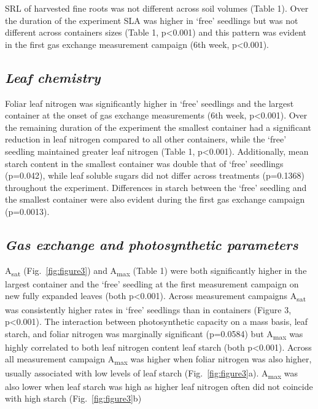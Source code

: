 \documentclass[a4paper]{article}\usepackage[]{graphicx}\usepackage[]{color}
\begin{document}
SRL of harvested fine roots was not different across soil volumes (Table 1). Over the duration of the experiment SLA was higher in ‘free’ seedlings but was not different across containers sizes (Table 1, p\textless0.001) and this pattern was evident in the first gas exchange measurement campaign (6th week, p\textless0.001).


\subsection*{\textit{Leaf chemistry}}
Foliar leaf nitrogen was significantly higher in ‘free’ seedlings and the largest container at the onset of gas exchange measurements (6th week, p\textless0.001).  Over the remaining duration of the experiment the smallest container had a significant reduction in leaf nitrogen compared to all other containers, while the ‘free’ seedling maintained greater leaf nitrogen (Table 1, p\textless0.001).  Additionally, mean starch content in the smallest container was double that of ‘free’ seedlings (p=0.042), while leaf soluble sugars did not differ across treatments (p=0.1368) throughout the experiment.  Differences in starch between the ‘free’ seedling and the smallest container were also evident during the first gas exchange campaign (p=0.0013).

\subsection*{\textit{Gas exchange and photosynthetic parameters}}
A\textsubscript{sat} (Fig.~\ref{fig:figure3}) and A\textsubscript{max} (Table 1) were both significantly higher in the largest container and the ‘free’ seedling at the first measurement campaign on new fully expanded leaves (both p\textless0.001). Across measurement campaigns A\textsubscript{sat} was consistently higher rates in ‘free’ seedlings than in containers (Figure 3, p\textless0.001). The interaction between photosynthetic capacity on a mass basis, leaf starch, and foliar nitrogen was marginally significant (p=0.0584) but A\textsubscript{max} was highly correlated to both leaf nitrogen content leaf starch (both p\textless0.001). Across all measurement campaign A\textsubscript{max} was higher when foliar nitrogen was also higher, usually associated with low levels of leaf starch (Fig.~\ref{fig:figure3}a). A\textsubscript{max} was also lower when leaf starch was high as higher leaf nitrogen often did not coincide with high starch (Fig.~\ref{fig:figure3}b)
\end{document}
